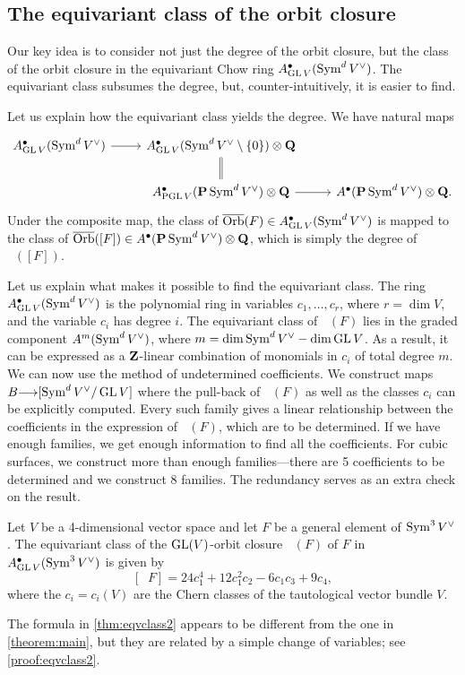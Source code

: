 \documentclass[11pt,reqno, letterpaper]{amsart}
\DeclareMathOperator{\Orb}{\overline{Orb}}
\renewcommand{\to}{{\longrightarrow}}
\numberwithin{equation}{section}
\begin{document}
\subsection{The equivariant class of the orbit closure}
Our key idea is to consider not just the degree of the orbit closure,
but the class of the orbit closure in the equivariant Chow ring
$A^\bullet_{\operatorname{GL} V}(\operatorname{Sym}^dV^\vee)$.
The equivariant class subsumes the
degree, but, counter-intuitively, it is easier to find.

Let us explain how the equivariant class yields the degree.
We have natural maps
\[
\begin{tikzcd}
  A^\bullet_{\GL V}(\Sym^dV^\vee) \ar{r}& A^\bullet_{\GL V}(\Sym^d V^\vee \setminus
  \{0\}) \otimes \Q \ar[equal]{d}\\
  &A^\bullet_{\PGL V}(\P \Sym^dV^\vee) \otimes \Q \ar{r}&
  A^\bullet(\P \Sym^dV^\vee) \otimes \Q.
\end{tikzcd}
\]
Under the composite map, the class of $\Orb(F) \in A^\bullet_{\GL
  V}(\Sym^dV^\vee)$ is mapped to the class of $\Orb([F]) \in
A^\bullet(\P \Sym^dV^\vee) \otimes \Q$, which is simply the degree of $\Orb([F])$.

Let us explain what makes it possible to find the equivariant
class.  The ring $A^\bullet_{\operatorname{GL} V}(\operatorname{Sym}^dV^\vee)$ is the polynomial ring
in variables $c_1, \dots, c_r$, where $r = \dim V$, and the variable
$c_i$ has degree $i$.  The equivariant class of $\Orb(F)$ lies in the
graded component $A^m(\operatorname{Sym}^dV^\vee)$, where
$m = \dim \operatorname{Sym}^d V^\vee - \dim \operatorname{GL} V$.  As a result, it can be expressed as
a ${\bf Z}$-linear combination of monomials in $c_i$ of total degree
$m$. We can now use the method of undetermined coefficients.  We
construct maps $B \to [\Sym^dV^\vee/\GL V]$ where the pull-back of
$\Orb(F)$ as well as the classes $c_i$ can be explicitly
computed. Every such family gives a linear relationship between the
coefficients in the expression of $\Orb(F)$, which are to be determined.
If we have enough families, we get enough information to find all the coefficients.
For cubic surfaces, we construct more than enough families---there are 5
coefficients to be determined and we construct 8 families. The redundancy
serves as an extra check on the result.
\begin{theorem}\label{thm:eqvclass2}
  Let $V$ be a 4-dimensional vector space and let $F$ be a general
  element of $\operatorname{Sym}^3 V^\vee$.
  The equivariant class of the $\operatorname{GL}(V)$-orbit closure $\Orb(F)$ of $F$
  in $A^\bullet_{\operatorname{GL} V}(\operatorname{Sym}^3 V^\vee)$ is given by
  \[
    [\Orb F] = 24c_1^4 + 12c_1^2c_2 - 6c_1c_3 + 9c_4,
  \]
  where the \(c_i = c_i(V)\) are the Chern classes of the tautological vector
  bundle $V$.
\end{theorem}
The formula in \autoref{thm:eqvclass2} appears to be different from the one
in \autoref{theorem:main}, but they are related by a simple change of
variables; see \autoref{proof:eqvclass2}.
\end{document}
